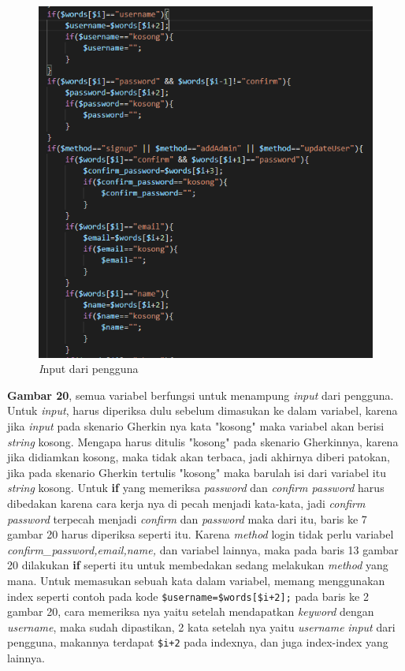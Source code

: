 \documentclass[a4paper,twoside]{article}
\begin{document}
\begin{enumerate}
\begin{figure}[h!]
			\includegraphics[scale=1.00]{../DokumenSkripsi/gambar/implementasi9}
			\centering
			\caption{\textit Input dari pengguna}
		\end{figure}

\textbf{Gambar 20}, semua variabel berfungsi untuk menampung \textit{input} dari pengguna. Untuk \textit{input}, harus diperiksa dulu sebelum dimasukan ke dalam variabel, karena jika \textit{input} pada skenario Gherkin nya kata "kosong" maka variabel akan berisi \textit{string} kosong. Mengapa harus ditulis "kosong" pada skenario Gherkinnya, karena jika didiamkan kosong, maka tidak akan terbaca, jadi akhirnya diberi patokan, jika pada skenario Gherkin tertulis "kosong" maka barulah isi dari variabel itu \textit{string} kosong. Untuk \textbf{if} yang memeriksa \textit{password} dan \textit{confirm password} harus dibedakan karena cara kerja nya di pecah menjadi kata-kata, jadi \textit{confirm password} terpecah menjadi \textit{confirm} dan \textit{password} maka dari itu, baris ke 7 gambar 20 harus diperiksa seperti itu. Karena \textit{method} login tidak perlu variabel \textit{confirm\_password,email,name, }dan variabel lainnya, maka pada baris 13 gambar 20 dilakukan \textbf{if} seperti itu untuk membedakan sedang melakukan \textit{method} yang mana. Untuk memasukan sebuah kata dalam variabel, memang menggunakan index seperti contoh pada kode \texttt{\$username=\$words[\$i+2];} pada baris ke 2 gambar 20, cara memeriksa nya yaitu setelah mendapatkan \textit{keyword} dengan \textit{username}, maka sudah dipastikan, 2 kata setelah nya yaitu \textit{username} \textit{input} dari pengguna, makannya terdapat \texttt{\$i+2} pada indexnya, dan juga index-index yang lainnya.


\end{enumerate}
\end{document}
